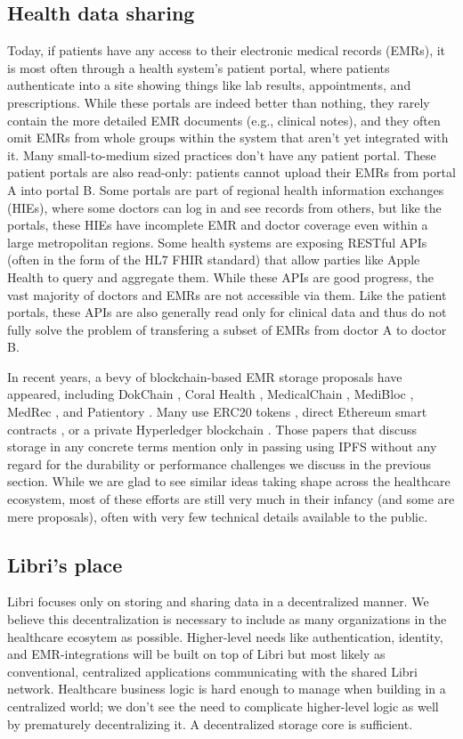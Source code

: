 \documentclass[10pt]{article}
\begin{document}
\subsection{Health data sharing}
Today, if patients have any access to their electronic medical records (EMRs), it is most often through a health system's patient portal, where patients authenticate into a site showing things like lab results, appointments, and prescriptions. While these portals are indeed better than nothing, they rarely contain the more detailed EMR documents (e.g., clinical notes), and they often omit EMRs from whole groups within the system that aren't yet integrated with it. Many small-to-medium sized practices don't have any patient portal. These patient portals are also read-only: patients cannot upload their EMRs from portal A into portal B. Some portals are part of regional health information exchanges (HIEs), where some doctors can log in and see records from others, but like the portals, these HIEs have incomplete EMR and doctor coverage even within a large metropolitan regions. Some health systems are exposing RESTful APIs (often in the form of the HL7 FHIR standard) that allow  parties like Apple Health to query and aggregate them. While these APIs are good progress, the vast majority of doctors and EMRs are not accessible via them. Like the patient portals, these APIs are also generally read only for clinical data and thus do not fully solve the problem of transfering a subset of EMRs from doctor A to doctor B.

In recent years, a bevy of blockchain-based EMR storage proposals have appeared, including DokChain \cite{dokchain}, Coral Health \cite{coralhealth}, MedicalChain \cite{medicalchain}, MediBloc \cite{medibloc}, MedRec \cite{medrec}, and Patientory \cite{patientory}. Many use ERC20 tokens \cite{coralhealth,medibloc}, direct Ethereum smart contracts \cite{medrec,patientory}, or a private Hyperledger blockchain \cite{dokchain,medicalchain}. Those papers \cite{dokchain,coralhealth,medibloc} that discuss storage in any concrete terms mention only in passing using IPFS without any regard for the durability or performance challenges we discuss in the previous section. While we are glad to see similar ideas taking shape across the healthcare ecosystem, most of these efforts are still very much in their infancy (and some are mere proposals), often with very few technical details available to the public. 

\subsection{Libri's place}
Libri focuses only on storing and sharing data in a decentralized manner. We believe this decentralization is necessary to include as many organizations in the healthcare ecosytem as possible. Higher-level needs like authentication, identity, and EMR-integrations will be built on top of Libri but most likely as conventional, centralized applications communicating with the shared Libri network. Healthcare business logic is hard enough to manage when building in a centralized world; we don't see the need to complicate higher-level logic as well by prematurely decentralizing it. A decentralized storage core is sufficient.
\end{document}
